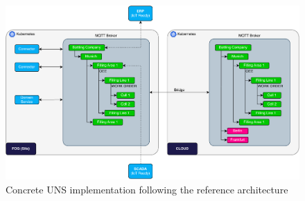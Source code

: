     \begin{figure}[htbp]
        \centering
        \includegraphics[width=\textwidth]{img/UNS_Reference_Implementation_Strategy_bold.pdf}
        \caption{Concrete UNS implementation following the reference architecture \cite{building_iiot}}
        \label{figure:uns-impl-strategy}
    \end{figure}

